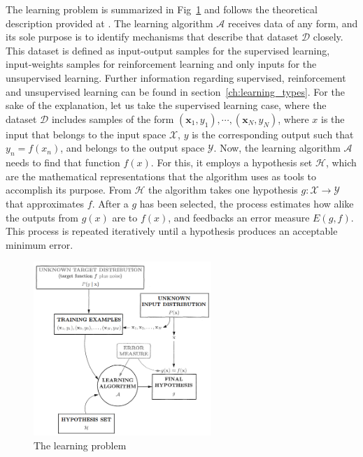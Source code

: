The learning problem is summarized in Fig~\ref{fig:learning_problem} and follows the theoretical description provided at \cite{Yaser}. The learning algorithm \( \mathcal{A} \) receives data of any form, and its sole purpose is to identify mechanisms that describe that dataset \( \mathcal{D} \) closely. This dataset is defined as input-output samples for the supervised learning, input-weights samples for reinforcement learning and only inputs for the unsupervised learning. Further information regarding supervised, reinforcement and unsupervised learning can be found in section~\ref{ch:learning_types}. For the sake of the explanation, let us take the supervised learning case, where the dataset  \( \mathcal{D} \) includes samples of the form \((\mathbf{x}_1, y_1),\cdots , (\mathbf{x}_N, y_N) \), where \(x\) is the input that belongs to the input space \( \mathcal{X} \), \(y\) is the corresponding output such that \(y_n = f(x_n)\), and belongs to the output space \( \mathcal{Y}\). Now, the learning algorithm \( \mathcal{A} \) needs to find that function \(f(x)\). For this, it employs a hypothesis set \( \mathcal{H} \), which are the mathematical representations that the algorithm uses as tools to accomplish its purpose. From \( \mathcal{H} \) the algorithm takes one hypothesis \( g:\mathcal{ X \rightarrow Y} \) that approximates \(f\). After a \(g\) has been selected, the process estimates how alike the outputs from \(g(x)\) are to \(f(x)\), and feedbacks an error measure \(E(g,f)\). This process is repeated iteratively until a hypothesis produces an acceptable minimum error. \\

\begin{figure}[htb]
    \centering
      \includegraphics[width=0.6\textwidth]{figures/learning_problem.png}
      \caption{The learning problem \cite{Yaser}}
      \label{fig:learning_problem}
\end{figure}

